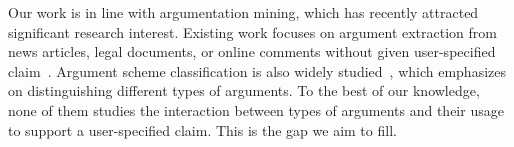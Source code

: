 Our work is in line with argumentation mining, which has recently attracted significant research interest. Existing work focuses on argument extraction from news articles, legal documents, or online comments without given user-specified claim~\cite{moens2007automatic,palau2009argumentation,mochales2011argumentation,park2014identifying}.  
Argument scheme classification is also widely studied~\cite{biran2011identifying,feng2011classifying,rooney2012applying,stab2014identifying,alkhatib-EtAl:2016:COLING}, which emphasizes on distinguishing different types of arguments. To the best of our knowledge, none of them studies the interaction between types of arguments and their usage to support a user-specified claim. This is the gap we aim to fill.

 



